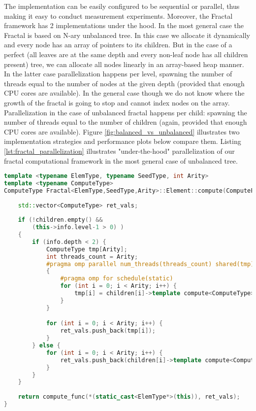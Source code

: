 \quad The implementation can be easily configured to be sequential or parallel, thus making it easy to conduct measurement experiments. Moreover, the Fractal framework has 2 implementations under the hood. In the most general case the Fractal is based on N-ary unbalanced tree. In this case we allocate it dynamically and every node has an array of pointers to its children. But in the case of a perfect (all leaves are at the same depth and every non-leaf node has all children present) tree, we can allocate all nodes linearly in an array-based heap manner. In the latter case parallelization happens per level, spawning the number of threads equal to the number of nodes at the given depth (provided that enough CPU cores are available). In the general case though we do not know where the growth of the fractal is going to stop and cannot index nodes on the array. Parallelization in the case of unbalanced fractal happens per child: spawning the number of threads equal to the number of children (again, provided that enough CPU cores are available). Figure \ref{fig:balanced_vs_unbalanced} illustrates two implementation strategies and performance plots below compare them. Listing \ref{lst:fractal_parallelization} illustrates "under-the-hood" parallelization of our fractal computational framework in the most general case of unbalanced tree.
\begin{lstlisting}[caption={The "under-the-hood" parallelization of unbalanced Fractal computational framework},label={lst:fractal_parallelization},language=C++]
template <typename ElemType, typename SeedType, int Arity>
template <typename ComputeType>
ComputeType Fractal<ElemType,SeedType,Arity>::Element::compute(ComputeFunction<ComputeType>& compute_func) {
    
    std::vector<ComputeType> ret_vals;
    
    if (!children.empty() && 
        (this->info.level-1 > 0) )
    { 
        if (info.depth < 2) {
            ComputeType tmp[Arity];
            int threads_count = Arity;
            #pragma omp parallel num_threads(threads_count) shared(tmp)
            {
                #pragma omp for schedule(static)
                for (int i = 0; i < Arity; i++) {
                    tmp[i] = children[i]->template compute<ComputeType>(compute_func);
                }
            }

            for (int i = 0; i < Arity; i++) {
                ret_vals.push_back(tmp[i]);
            }
        } else {
            for (int i = 0; i < Arity; i++) {
                ret_vals.push_back(children[i]->template compute<ComputeType>(compute_func));
            }
        }
    }
   
    return compute_func(*(static_cast<ElemType*>(this)), ret_vals);
}
\end{lstlisting}

